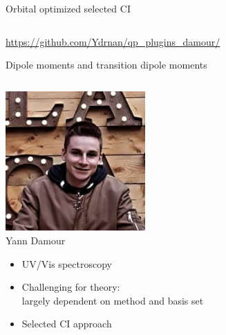 \documentclass[aspectratio=169,9pt]{beamer}
\begin{document}
\begin{frame}{Orbital optimized selected CI}
\begin{columns}
        \end{columns}

                        \bigskip
                        \centering
	\url{https://github.com/Ydrnan/qp_plugins_damour/}

\end{frame}


\begin{frame}{Dipole moments and transition dipole moments}

\begin{columns}
\begin{column}{0.5\textwidth}

\centering
\includegraphics[width=0.4\textwidth]{fig/Yann2.jpg}
\\
Yann Damour
\\
\begin{itemize}

	\item UV/Vis spectroscopy
                        \bigskip
	\item Challenging for theory: \\ largely dependent on method and basis set 
                        \bigskip
	\item Selected CI approach 
\end{itemize}
\end{column}


\end{columns}
\end{frame}
\end{document}
